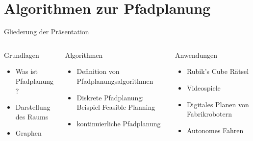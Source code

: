 \documentclass[t,aspectratio=169,dvipsnames]{beamer}
\begin{document}
\section{Algorithmen zur Pfadplanung}

\begin{frame}{Gliederung der Präsentation}
	\begin{columns}[T]
		\begin{column}[T]{0.33\textwidth}
			\begin{block}{Grundlagen}
				\begin{itemize}
					\item Was ist Pfadplanung?
					\item Darstellung des Raums
					\item Graphen
					\newline\newline\newline
				\end{itemize}
			\end{block}
		\end{column}
		\begin{column}[T]{0.33\textwidth}
			\begin{block}{Algorithmen}
				\begin{itemize}
					\item Definition von Pfadplanungsalgorithmen
					\item Diskrete Pfadplanung: Beispiel Feasible Planning
					\item kontinuierliche Pfadplanung
				\end{itemize}
			\end{block}
		\end{column}
		\begin{column}[T]{0.33\textwidth}
			\begin{block}{Anwendungen}
				\begin{itemize}\color{lightgray}
					\item Rubik's Cube Rätsel
					\item Videospiele
					\item Digitales Planen von Fabrikrobotern
					\item Autonomes Fahren
					\newline\newline
				\end{itemize}		
			\end{block}
		\end{column}
	\end{columns}	
\end{frame}
\end{document}
